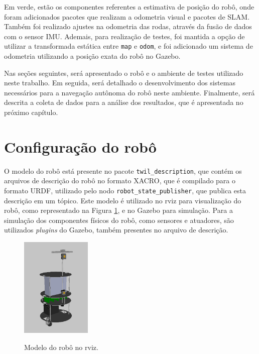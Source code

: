 \documentclass[repeatfields,xlists,xpacks,oneside,yearsonly]{ufrgscca}
\begin{document}
Em verde, estão os componentes referentes a estimativa de posição do
robô, onde foram adicionados pacotes que realizam a odometria visual
e pacotes de SLAM. Também foi realizado ajustes na odometria das
rodas, através da fusão de dados com o sensor IMU. Ademais, para
realização de testes, foi mantida a opção de utilizar a transformada
estática entre \texttt{map} e \texttt{odom}, e foi adicionado um
sistema de odometria utilizando a posição exata do robô no Gazebo.

Nas seções seguintes, será apresentado o robô e o ambiente de testes
utilizado neste trabalho. Em seguida, será detalhado o
desenvolvimento dos sistemas necessários para a navegação autônoma do
robô neste ambiente. Finalmente, será descrita a coleta de dados para
a análise dos resultados, que é apresentada no próximo capítulo.

\section{Configuração do robô}

O modelo do robô está presente no pacote \texttt{twil\_description},
que contém os arquivos de descrição do robô no formato XACRO, que é
compilado para o formato URDF, utilizado pelo nodo
\texttt{robot\_state\_publisher}, que publica esta descrição em um
tópico. Este modelo é utilizado no rviz para visualização do robô,
como representado na Figura \ref{fig:robo_rviz}, e no Gazebo para
simulação. Para a simulação dos componentes físicos do robô, como
sensores e atuadores, são utilizados \textit{plugins} do Gazebo,
também presentes no arquivo de descrição.


\begin{figure}[h]
    {
        \centering
        \caption{Modelo do robô no rviz.}
        \label{fig:robo_rviz}
        \includegraphics[width=0.3\textwidth]{robo_rviz.png}\\
    }
\end{figure}
\end{document}
